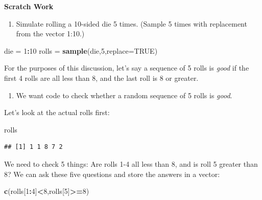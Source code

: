 \documentclass[
]{book}
\newenvironment{Shaded}{\begin{snugshade}}{\end{snugshade}}
\newcommand{\AttributeTok}[1]{\textcolor[rgb]{0.13,0.29,0.53}{#1}}
\newcommand{\ConstantTok}[1]{\textcolor[rgb]{0.56,0.35,0.01}{#1}}
\newcommand{\DecValTok}[1]{\textcolor[rgb]{0.00,0.00,0.81}{#1}}
\newcommand{\FunctionTok}[1]{\textcolor[rgb]{0.13,0.29,0.53}{\textbf{#1}}}
\newcommand{\NormalTok}[1]{#1}
\newcommand{\OtherTok}[1]{\textcolor[rgb]{0.56,0.35,0.01}{#1}}
\newcommand{\SpecialCharTok}[1]{\textcolor[rgb]{0.81,0.36,0.00}{\textbf{#1}}}
\providecommand{\tightlist}{%
  \setlength{\itemsep}{0pt}\setlength{\parskip}{0pt}}
\theoremstyle{definition}
\theoremstyle{definition}
\theoremstyle{definition}
\theoremstyle{definition}
\theoremstyle{remark}
\begin{document}
\textbf{Scratch Work}

\begin{enumerate}
\def\labelenumi{\arabic{enumi}.}
\tightlist
\item
  Simulate rolling a 10-sided die 5 times. (Sample 5 times with replacement from the vector 1:10.)
\end{enumerate}

\begin{Shaded}
\begin{Highlighting}[]
\NormalTok{die }\OtherTok{=} \DecValTok{1}\SpecialCharTok{:}\DecValTok{10}
\NormalTok{rolls }\OtherTok{=} \FunctionTok{sample}\NormalTok{(die,}\DecValTok{5}\NormalTok{,}\AttributeTok{replace=}\ConstantTok{TRUE}\NormalTok{)}
\end{Highlighting}
\end{Shaded}

For the purposes of this discussion, let's say a sequence of 5 rolls is \emph{good} if the first 4 rolls are all less than 8, and the last roll is 8 or greater.

\begin{enumerate}
\def\labelenumi{\arabic{enumi}.}
\setcounter{enumi}{1}
\tightlist
\item
  We want code to check whether a random sequence of 5 rolls is \emph{good}.
\end{enumerate}

Let's look at the actual rolls first:

\begin{Shaded}
\begin{Highlighting}[]
\NormalTok{rolls}
\end{Highlighting}
\end{Shaded}

\begin{verbatim}
## [1] 1 1 8 7 2
\end{verbatim}

We need to check 5 things: Are rolls 1-4 all less than 8, and is roll 5 greater than 8? We can ask these five questions and store the answers in a vector:

\begin{Shaded}
\begin{Highlighting}[]
\FunctionTok{c}\NormalTok{(rolls[}\DecValTok{1}\SpecialCharTok{:}\DecValTok{4}\NormalTok{]}\SpecialCharTok{\textless{}}\DecValTok{8}\NormalTok{,rolls[}\DecValTok{5}\NormalTok{]}\SpecialCharTok{\textgreater{}=}\DecValTok{8}\NormalTok{)}
\end{Highlighting}
\end{Shaded}
\end{document}
